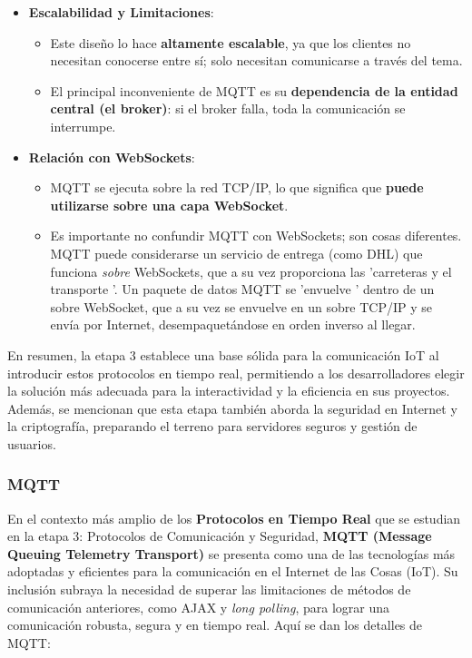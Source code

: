 \documentclass{report}
\begin{document}
\begin{itemize}
    \item \textbf{Escalabilidad y Limitaciones}:
    \begin{itemize}
        \item Este diseño lo hace \textbf{altamente escalable}, ya que los clientes no necesitan conocerse entre sí; solo necesitan comunicarse a 
        través del tema.
        \item El principal inconveniente de MQTT es su \textbf{dependencia de la entidad central (el broker)}: si el broker falla, toda la comunicación 
        se interrumpe.
    \end{itemize}

    \item \textbf{Relación con WebSockets}:
    \begin{itemize}
        \item MQTT se ejecuta sobre la red TCP/IP, lo que significa que \textbf{puede utilizarse sobre una capa WebSocket}.
        \item Es importante no confundir MQTT con WebSockets; son cosas diferentes. MQTT puede considerarse un servicio de entrega (como DHL) que funciona 
        \textit{sobre} WebSockets, que a su vez proporciona las  'carreteras y el transporte '. Un paquete de datos MQTT se  'envuelve ' dentro de un sobre 
        WebSocket, que a su vez se envuelve en un sobre TCP/IP y se envía por Internet, desempaquetándose en orden inverso al llegar.
    \end{itemize}
\end{itemize}
En resumen, la etapa 3 establece una base sólida para la comunicación IoT al introducir estos protocolos en tiempo real, permitiendo a los desarrolladores 
elegir la solución más adecuada para la interactividad y la eficiencia en sus proyectos. Además, se  mencionan que esta etapa también aborda 
la seguridad en Internet y la criptografía, preparando el terreno para servidores seguros y gestión de usuarios.

\subsubsection{MQTT}
En el contexto más amplio de los \textbf{Protocolos en Tiempo Real} que se estudian en la etapa 3: Protocolos de Comunicación y Seguridad, 
\textbf{MQTT (Message Queuing Telemetry Transport)} se presenta como una de las tecnologías más adoptadas y eficientes para la comunicación en el 
Internet de las Cosas (IoT). Su inclusión subraya la necesidad de superar las limitaciones de métodos de comunicación anteriores, como AJAX y 
\textit{long polling}, para lograr una comunicación robusta, segura y en tiempo real. Aquí se dan los detalles de MQTT:
\end{document}
